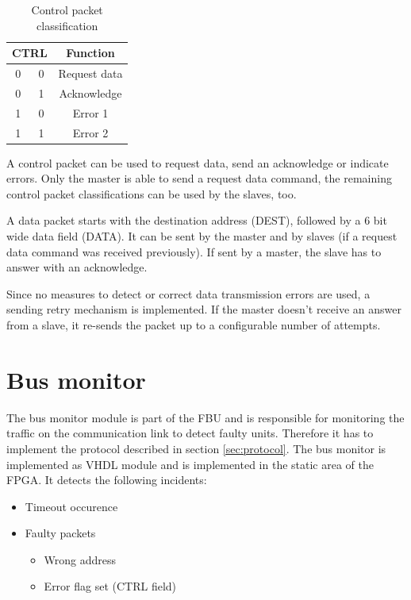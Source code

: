 \begin{table}[h!]
\begin{center}
\begin{tabular}{|c|c|c|}
\hline
\multicolumn{2}{|c|}{\textbf{CTRL}}&\textbf{Function} \\
\hline
0 & 0 & Request data \\
\hline
0 & 1 & Acknowledge \\
\hline
1 & 0 & Error 1 \\
\hline
1 & 1 & Error 2 \\
\hline
\end{tabular}
\end{center}
\caption{Control packet classification}
\label{tab:controlPacket}
\end{table}

A control packet can be used to request data, send an acknowledge or indicate errors. Only the master is able to send a request data command, the remaining control packet classifications can be used by the slaves, too.

A data packet starts with the destination address (DEST), followed by a 6 bit wide data field (DATA). It can be sent by the master and by slaves (if a request data command was received previously). If sent by a master, the slave has to answer with an acknowledge.

Since no measures to detect or correct data transmission errors are used, a sending retry mechanism is implemented. If the master doesn't receive an answer from a slave, it re-sends the packet up to a configurable number of attempts.

\section{Bus monitor}

The bus monitor module is part of the \gls{FBU} and is responsible for monitoring the traffic on the communication link to detect faulty units. Therefore it has to implement the protocol described in section \ref{sec:protocol}. 
The bus monitor is implemented as VHDL module and is implemented in the static area of the \gls{FPGA}. It detects the following incidents:

\begin{itemize}
    \item Timeout occurence
    \item Faulty packets
	\begin{itemize}
    		\item Wrong address
   		\item Error flag set (CTRL field)
	\end{itemize}
\end{itemize}

